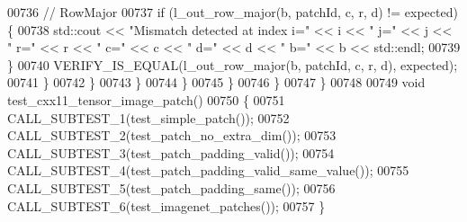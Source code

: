 \begin{DoxyCode}
00736               \textcolor{comment}{// RowMajor}
00737               \textcolor{keywordflow}{if} (l\_out\_row\_major(b, patchId, c, r, d) != expected) \{
00738                 std::cout << \textcolor{stringliteral}{"Mismatch detected at index i="} << i << \textcolor{stringliteral}{" j="} << j << \textcolor{stringliteral}{" r="} << r << \textcolor{stringliteral}{" c="} << c
       << \textcolor{stringliteral}{" d="} << d << \textcolor{stringliteral}{" b="} << b << std::endl;
00739               \}
00740               VERIFY\_IS\_EQUAL(l\_out\_row\_major(b, patchId, c, r, d), expected);
00741             \}
00742           \}
00743         \}
00744       \}
00745     \}
00746   \}
00747 \}
00748 
00749 \textcolor{keywordtype}{void} test\_cxx11\_tensor\_image\_patch()
00750 \{
00751   CALL\_SUBTEST\_1(test\_simple\_patch());
00752   CALL\_SUBTEST\_2(test\_patch\_no\_extra\_dim());
00753   CALL\_SUBTEST\_3(test\_patch\_padding\_valid());
00754   CALL\_SUBTEST\_4(test\_patch\_padding\_valid\_same\_value());
00755   CALL\_SUBTEST\_5(test\_patch\_padding\_same());
00756   CALL\_SUBTEST\_6(test\_imagenet\_patches());
00757 \}
\end{DoxyCode}
